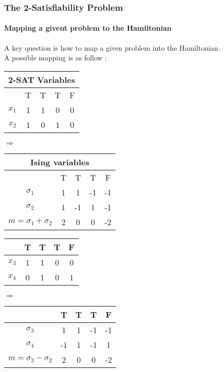 \documentclass{beamer}
\begin{document}
\begin{frame}
	\frametitle{The 2-Satisfiability Problem}
	\framesubtitle{Mapping a givent problem to the Hamiltonian}
	A key question is how to map a given problem into the Hamiltonian. \\
	A possible mapping is as follow :
	\begin{table}[h!]
		
		
		
		\begin{center}
			\begin{tabular}{|c|c|c|c|c|}
				
				\multicolumn{5}{c}{2-SAT Variables}\\
				\hline
				& T & T & T & F \\
				\hline
				\hline
				$x_1$ & 1 & 1 & 0 & 0 \\
				\hline
				$x_2$ & 1 & 0 & 1 & 0 \\
				\hline
			\end{tabular}
			\quad
			$\Rightarrow$
			\quad
			\begin{tabular}{|c|c|c|c|c|}
				\multicolumn{5}{c}{Ising variables}\\
				\hline
				& T & T & T & F \\
				\hline
				\hline
				$\sigma_1$ & 1 & 1 & -1 & -1 \\
				\hline
				$\sigma_2$ & 1 & -1 & 1 & -1 \\
				\hline
				$m=\sigma_1+\sigma_2$ & 2 & 0 & 0 & -2 \\
				\hline
			\end{tabular}
		\end{center}
		
		\begin{center}
			\begin{tabular}{|c|c|c|c|c|}
				
				\hline
				& T & T & T & F \\
				\hline
				\hline
				$x_3$ & 1 & 1 & 0 & 0 \\
				\hline
				$x_4$ & 0 & 1 & 0 & 1 \\
				\hline
				
			\end{tabular}
			\quad
			$\Rightarrow$
			\quad
			\begin{tabular}{|c|c|c|c|c|}
				\hline
				& T & T & T & F \\
				\hline
				\hline
				$\sigma_3$ & 1 & 1 & -1 & -1 \\
				\hline
				$\sigma_4$ & -1 & 1 & -1 & 1 \\
				\hline
				$m=\sigma_3-\sigma_2$ & 2 & 0 & 0 & -2 \\
				\hline
			\end{tabular} 
			
		\end{center}
	\end{table} 
	
\end{frame}
\end{document}
